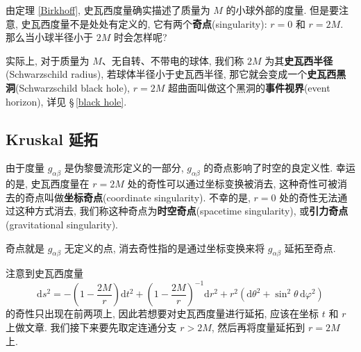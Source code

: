 由定理 \ref{Birkhoff}, 史瓦西度量确实描述了质量为 $M$ 的小球外部的度量. 但是要注意, 史瓦西度量不是处处有定义的, 它有两个{\bf 奇点}(singularity): $r=0$ 和 $r=2M$. 那么当小球半径小于 $2M$ 时会怎样呢?

实际上, 对于质量为 $M$、无自转、不带电的球体, 我们称 $2M$ 为其{\bf 史瓦西半径}(Schwarzschild radius), 若球体半径小于史瓦西半径, 那它就会变成一个{\bf 史瓦西黑洞}(Schwarzschild black hole), $r=2M$ 超曲面叫做这个黑洞的{\bf 事件视界}(event horizon), 详见 \S\,\ref{black hole}.

\subsection{Kruskal 延拓}
由于度量 $g_{\alpha\beta}$ 是伪黎曼流形定义的一部分, $g_{\alpha\beta}$ 的奇点影响了时空的良定义性. 幸运的是, 史瓦西度量在 $r=2M$ 处的奇性可以通过坐标变换被消去, 这种奇性可被消去的奇点叫做{\bf 坐标奇点}(coordinate singularity). 不幸的是, $r=0$ 处的奇性无法通过这种方式消去, 我们称这种奇点为{\bf 时空奇点}(spacetime singularity), 或{\bf 引力奇点}(gravitational singularity).
\begin{remark}
	奇点就是 $g_{\alpha\beta}$ 无定义的点, 消去奇性指的是通过坐标变换来将 $g_{\alpha\beta}$ 延拓至奇点.
\end{remark}

注意到史瓦西度量
\[ \mathrm{d}s^2=-\left( 1-\frac{2M}{r} \right)\mathrm{d}t^2+\left( 1-\frac{2M}{r} \right)^{-1}\mathrm{d}r^2+r^2(\mathrm{d}\theta^2+\sin^2\theta\,\mathrm{d}\varphi^2) \] 
的奇性只出现在前两项上, 因此若想要对史瓦西度量进行延拓, 应该在坐标 $t$ 和 $r$ 上做文章. 我们接下来要先取定连通分支 $r>2M$, 然后再将度量延拓到 $r=2M$ 上.

